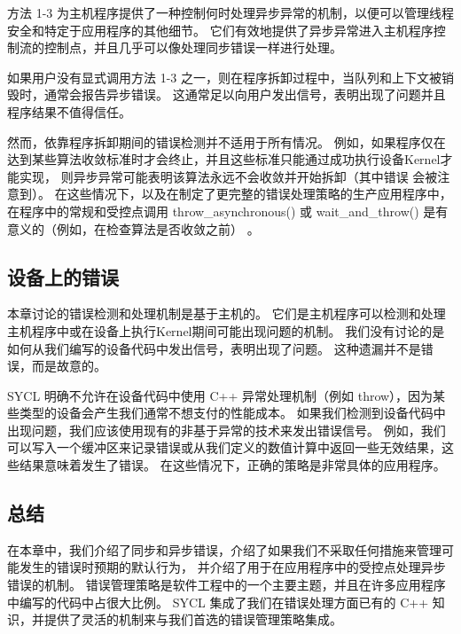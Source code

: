方法 1-3 为主机程序提供了一种控制何时处理异步异常的机制，以便可以管理线程安全和特定于应用程序的其他细节。 
它们有效地提供了异步异常进入主机程序控制流的控制点，并且几乎可以像处理同步错误一样进行处理。

如果用户没有显式调用方法 1-3 之一，则在程序拆卸过程中，当队列和上下文被销毁时，通常会报告异步错误。 
这通常足以向用户发出信号，表明出现了问题并且程序结果不值得信任。

然而，依靠程序拆卸期间的错误检测并不适用于所有情况。 
例如，如果程序仅在达到某些算法收敛标准时才会终止，并且这些标准只能通过成功执行设备Kernel才能实现，
则异步异常可能表明该算法永远不会收敛并开始拆卸（其中错误 会被注意到）。 
在这些情况下，以及在制定了更完整的错误处理策略的生产应用程序中，
在程序中的常规和受控点调用 throw\_asynchronous() 
或 wait\_and\_throw() 是有意义的（例如，在检查算法是否收敛之前） 。

\subsection{设备上的错误}
本章讨论的错误检测和处理机制是基于主机的。 
它们是主机程序可以检测和处理主机程序中或在设备上执行Kernel期间可能出现问题的机制。 
我们没有讨论的是如何从我们编写的设备代码中发出信号，表明出现了问题。 这种遗漏并不是错误，而是故意的。

SYCL 明确不允许在设备代码中使用 C++ 异常处理机制（例如 throw），因为某些类型的设备会产生我们通常不想支付的性能成本。 
如果我们检测到设备代码中出现问题，我们应该使用现有的非基于异常的技术来发出错误信号。 
例如，我们可以写入一个缓冲区来记录错误或从我们定义的数值计算中返回一些无效结果，这些结果意味着发生了错误。 
在这些情况下，正确的策略是非常具体的应用程序。

\subsection{总结}
在本章中，我们介绍了同步和异步错误，介绍了如果我们不采取任何措施来管理可能发生的错误时预期的默认行为，
并介绍了用于在应用程序中的受控点处理异步错误的机制。 
错误管理策略是软件工程中的一个主要主题，并且在许多应用程序中编写的代码中占很大比例。 
SYCL 集成了我们在错误处理方面已有的 C++ 知识，并提供了灵活的机制来与我们首选的错误管理策略集成。